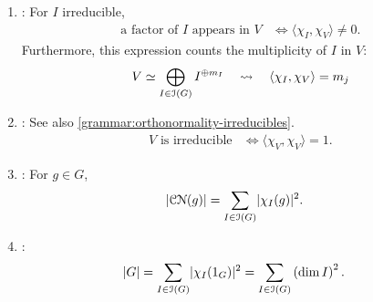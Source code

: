 \begin{enumerate}[leftmargin=*, label=(T\arabic*)]
{\begin{align*}
        N = \bigcap_{I \in \mathcal{J}} \Ker \chi_I
      .
    \end{align*}
  }
  \item\label{trans:irreducible-factor} {
    : For $I$ irreducible,
    \begin{align*}
      \text{a factor of } I \text{ appears in } V
      &\iff \langle \chi_I, \chi_V \rangle \neq 0
      .
    \end{align*}
    \pan Furthermore, this expression counts the multiplicity of $I$ in $V$:
    \begin{align*}
      V
      \simeq \bigoplus_{I \in \operatorname{\mathcal{I}}(G)} I^{\oplus m_I}
      \quad\rightsquigarrow\quad
      \langle \chi_I, \chi_V \rangle
      = m_j
    \end{align*}
  }
  \item\label{trans:irreducibility} {
    : See also \ref{grammar:orthonormality-irreducibles}.
    \begin{align*}
      V \text{ is irreducible}
      &\iff \langle \chi_V, \chi_V \rangle = 1
      .
    \end{align*}
  }
  \item\label{trans:order-centralisers} {
    : For $g \in G$,
    \begin{align*}
      \lvert \operatorname{\mathcal{CN}}(g) \rvert
      &= \sum_{I \in \operatorname{\mathcal{I}}(G)} \lvert \chi_I (g) \rvert^2
      .
    \end{align*}
  }
  \item\label{trans:order} {
    :
    \begin{align*}
      \lvert G \rvert
      &= \sum_{I \in \operatorname{\mathcal{I}}(G)} \lvert \chi_I (1_G) \rvert^2
      = \sum_{I \in \operatorname{\mathcal{I}}(G)} \left( \dim I \right)^2
      .
    \end{align*}
  }
\end{enumerate}
